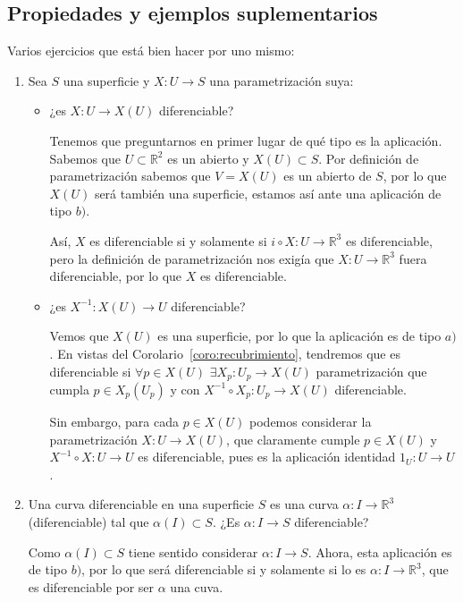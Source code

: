 \subsection{Propiedades y ejemplos suplementarios}
\begin{ejercicio}\label{ej:pecha_ejs}
    Varios ejercicios que está bien hacer por uno mismo:
    \begin{enumerate}
        \item Sea $S$ una superficie y $X:U\to S$ una parametrización suya:
            \begin{itemize}
                \item ¿es $X:U\to X(U)$ diferenciable?

                    Tenemos que preguntarnos en primer lugar de qué tipo es la aplicación. Sabemos que $U\subset\mathbb{R}^2$ es un abierto y $X(U)\subset S$. Por definición de parametrización sabemos que $V=X(U)$ es un abierto de $S$, por lo que $X(U)$ será también una superficie, estamos así ante una aplicación de tipo $b)$.

                    Así, $X$ es diferenciable si y solamente si $i\circ X:U\to \mathbb{R}^3$ es diferenciable, pero la definición de parametrización nos exigía que $X:U\to\mathbb{R}^3$ fuera diferenciable, por lo que $X$ es diferenciable.
                \item ¿es $X^{-1}:X(U)\to U$ diferenciable? 

                    Vemos que $X(U)$ es una superficie, por lo que la aplicación es de tipo $a)$. En vistas del Corolario~\ref{coro:recubrimiento}, tendremos que es diferenciable si $\forall p\in X(U)$ $\exists X_p:U_p\to X(U)$ parametrización que cumpla $p\in X_p(U_p)$ y con $X^{-1}\circ X_p:U_p\to X(U)$ diferenciable.

                    Sin embargo, para cada $p\in X(U)$ podemos considerar la parametrización $X:U\to X(U)$, que claramente cumple $p\in X(U)$ y $X^{-1}\circ X:U\to U$ es diferenciable, pues es la aplicación identidad $1_U:U\to U$.
            \end{itemize}
        \item Una curva diferenciable en una superficie $S$ es una curva $\alpha:I\to \mathbb{R}^3$ (diferenciable) tal que $\alpha(I)\subset S$. ¿Es $\alpha:I\to S$ diferenciable? 

            Como $\alpha(I)\subset S$ tiene sentido considerar $\alpha:I\to S$. Ahora, esta aplicación es de tipo $b)$, por lo que será diferenciable si y solamente si lo es $\alpha:I\to\mathbb{R}^3$, que es diferenciable por ser $\alpha$ una cuva.


\end{enumerate}
\end{ejercicio}
